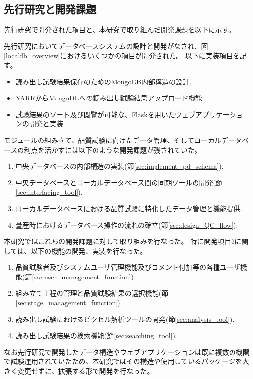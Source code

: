 \subsection{先行研究と開発課題}
先行研究で開発された項目と、本研究で取り組んだ開発課題を以下に示す。

先行研究\cite{4-6}においてデータベースシステムの設計と開発がなされ、図\ref{localdb_overview}におけるいくつかの項目が開発された。
以下に実装項目を記す。
\begin{itemize}
  \item 読み出し試験結果保存のためのMongoDB内部構造の設計.
  \item YARRからMongoDBへの読み出し試験結果アップロード機能.
  \item 試験結果のソート及び閲覧が可能な、Flaskを用いたウェブアプリケーションの開発と実装. 
\end{itemize}

モジュールの組み立て、品質試験に向けたデータ管理、そしてローカルデータベースの利点を活かすには以下のような開発課題が残されていた。
\begin{enumerate}
  \item 中央データベースの内部構造の実装(節\ref{sec:implement_pd_schema}).
  \item 中央データベースとローカルデータベース間の同期ツールの開発(節\ref{sec:interfacing_tool}).
  \item ローカルデータベースにおける品質試験に特化したデータ管理と機能提供.
  \item 量産時におけるデータベース操作の流れの確立(節\ref{sec:design_QC_flow}).
\end{enumerate}

本研究ではこれらの開発課題に対して取り組みを行なった。
特に開発項目3に関しては、以下の機能の開発、実装を行なった。
\begin{enumerate}
  \renewcommand{\labelenumi}{(\roman{enumi})} 
  \item 品質試験者及びシステムユーザ管理機能及びコメント付加等の各種ユーザ機能(節\ref{sec:user_management_function}).
  \item 組み立て工程の管理と品質試験結果の選択機能(節\ref{sec:stage_management_function}).
  \item 読み出し試験におけるピクセル解析ツールの開発(節\ref{sec:analysis_tool}).
  \item 読み出し試験結果の検索機能(節\ref{sec:searching_tool}).
\end{enumerate}

なお先行研究で開発したデータ構造やウェブアプリケーションは既に複数の機関で試験運用されていたため、本研究ではその構造や使用しているパッケージを大きく変更せずに、拡張する形で開発を行なった。

